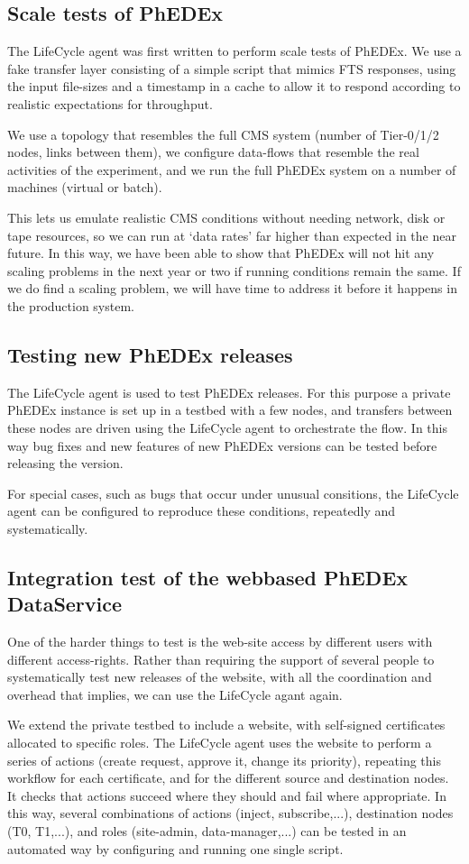\subsection{Scale tests of PhEDEx}
The LifeCycle agent was first written to perform scale tests of PhEDEx. We use a fake transfer layer consisting of a simple script that mimics FTS responses, using the input file-sizes and a timestamp in a cache to allow it to respond according to realistic expectations for throughput.

We use a topology that resembles the full CMS system (number of Tier-0/1/2 nodes, links between them), we configure data-flows that resemble the real activities of the experiment, and we run the full PhEDEx system on a number of machines (virtual or batch).

This lets us emulate realistic CMS conditions without needing network, disk or tape resources, so we can run at `data rates' far higher than expected in the near future. In this way, we have been able to show that PhEDEx will not hit any scaling problems in the next year or two if running conditions remain the same. If we do find a scaling problem, we will have time to address it before it happens in the production system.

\subsection{Testing new PhEDEx releases}

The LifeCycle agent is used to test PhEDEx releases. For this purpose a
private PhEDEx instance is set up in a testbed with a few nodes, and transfers
between these nodes are driven using the LifeCycle agent to orchestrate the
flow. In this way bug fixes and new features of new PhEDEx versions can
be tested before releasing the version. 

For special cases, such as bugs that occur under unusual consitions, the
LifeCycle agent can be configured to reproduce these conditions, repeatedly
and systematically.


\subsection{Integration test of the webbased PhEDEx DataService}

One of the harder things to test is the web-site access by different users
with different access-rights. Rather than requiring the support of several
people to systematically test new releases of the website, with all the
coordination and overhead that implies, we can use the LifeCycle agant again.

We extend the private testbed to include a website, with self-signed
certificates allocated to specific roles. The LifeCycle agent uses the website
to perform a series of actions (create request, approve it, change its
priority), repeating this workflow for each certificate, and for the different
source and destination nodes. It checks that actions succeed where they should
and fail where appropriate. In this way, several combinations of actions
(inject, subscribe,...), destination nodes (T0, T1,...), and roles
(site-admin, data-manager,...) can be tested in an automated way by
configuring and running one single script.
